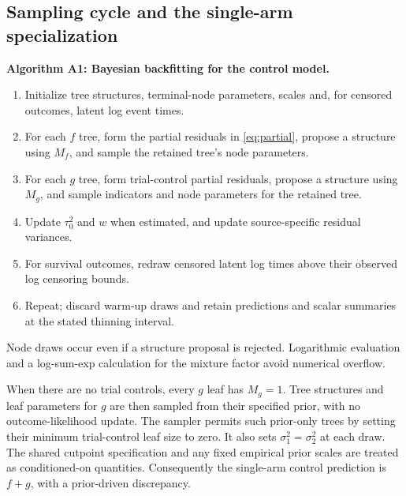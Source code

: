 \subsection{Sampling cycle and the single-arm specialization}\label{sec:A.6}
\noindent\textbf{Algorithm A1: Bayesian backfitting for the control model.}
\begin{enumerate}
\item Initialize tree structures, terminal-node parameters, scales and, for censored outcomes, latent log event times.
\item For each $f$ tree, form the partial residuals in \eqref{eq:partial}, propose a structure using $M_f$, and sample the retained tree's node parameters.
\item For each $g$ tree, form trial-control partial residuals, propose a structure using $M_g$, and sample indicators and node parameters for the retained tree.
\item Update $\tau_0^2$ and $w$ when estimated, and update source-specific residual variances.
\item For survival outcomes, redraw censored latent log times above their observed log censoring bounds.
\item Repeat; discard warm-up draws and retain predictions and scalar summaries at the stated thinning interval.
\end{enumerate}
Node draws occur even if a structure proposal is rejected. Logarithmic evaluation and a log-sum-exp calculation for the mixture factor avoid numerical overflow.

When there are no trial controls, every $g$ leaf has $M_g=1$. Tree structures and leaf parameters for $g$ are then sampled from their specified prior, with no outcome-likelihood update. The sampler permits such prior-only trees by setting their minimum trial-control leaf size to zero. It also sets $\sigma_{1}^2=\sigma_{2}^2$ at each draw. The shared cutpoint specification and any fixed empirical prior scales are treated as conditioned-on quantities. Consequently the single-arm control prediction is $f+g$, with a prior-driven discrepancy.
